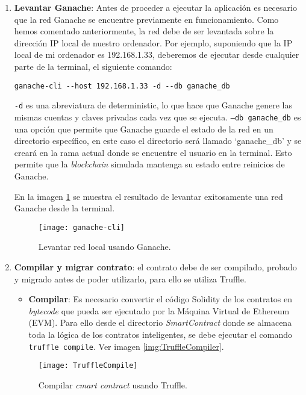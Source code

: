 \begin{enumerate}

\item \textbf{Levantar Ganache}: Antes de proceder a ejecutar la aplicación es necesario que la red Ganache se encuentre previamente en funcionamiento.
Como hemos comentado anteriormente, la red debe de ser levantada sobre la dirección IP local de nuestro ordenador. Por ejemplo, suponiendo que la IP local de mi ordenador es 192.168.1.33, deberemos de ejecutar desde cualquier parte de la terminal, el siguiente comando: 
\begin{verbatim}
ganache-cli --host 192.168.1.33 -d --db ganache_db
\end{verbatim}

\texttt{-d} es una abreviatura de deterministic, lo que hace que Ganache genere las mismas cuentas y claves privadas cada vez que se ejecuta.
\texttt{--db ganache\_db} es una opción que permite que Ganache guarde el estado de la red en un directorio específico, en este caso el directorio será llamado `ganache\_db' y se creará en la rama actual donde se encuentre el usuario en la terminal.
Esto permite que la \textit{blockchain} simulada mantenga su estado entre reinicios de Ganache.

En la imagen \ref{img:ganache-cli} se muestra el resultado de levantar exitosamente una red Ganache desde la terminal.

\begin{figure}[h]
	\label{img:ganache-cli}
	\centering
	\texttt{[image: ganache-cli]}
	\caption[Levantar red Ganache]{Levantar red local usando Ganache.}
\end{figure}

\item \textbf{Compilar y migrar contrato}: el contrato debe de ser compilado, probado y migrado antes de poder utilizarlo, para ello se utiliza Truffle.

	\begin{itemize}
	\item \textbf{Compilar}: Es necesario convertir el código
	Solidity de los contratos en \textit{bytecode} que pueda
	ser ejecutado por la Máquina Virtual de Ethereum (EVM).
	Para ello desde el directorio \textit{SmartContract} donde se
	almacena toda la lógica de los contratos
	inteligentes, se debe ejecutar el comando \texttt{truffle
	compile}.
	Ver imagen \ref{img:TruffleCompiler}.
	\end{itemize}
	
\begin{figure}[h]
	\label{img:TruffleCompile}
	\centering
	\texttt{[image: TruffleCompile]}
	\caption[Compilar smart contract]{Compilar \textit{cmart contract} usando Truffle.}
\end{figure}	
	

\end{enumerate}
